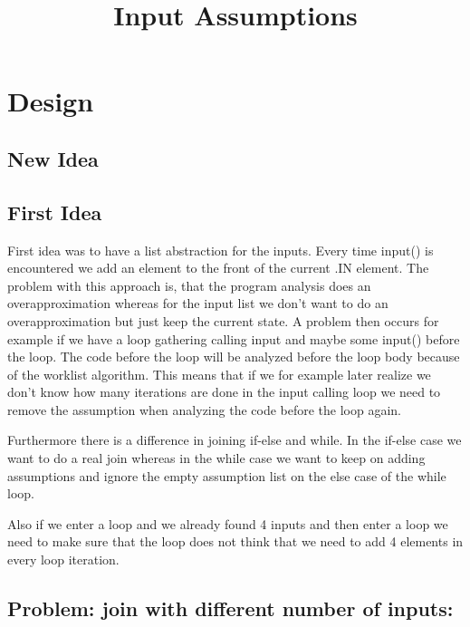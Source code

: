 \documentclass[11pt]{article}
\begin{document}
\title{Input Assumptions}

\maketitle


\section{Design}

\subsection{New Idea}



\subsection{First Idea}

First idea was to have a list abstraction for the inputs. Every time input() is encountered we add an element to the front of the current .IN element. The problem with this approach is, that the program analysis does an overapproximation whereas for the input list we don't want to do an overapproximation but just keep the current state. A problem then occurs for example if we have a loop gathering calling input and maybe some input() before the loop. The code before the loop will be analyzed before the loop body because of the worklist algorithm. This means that if we for example later realize we don't know how many iterations are done in the input calling loop we need to remove the assumption when analyzing the code before the loop again. 

Furthermore there is a difference in joining if-else and while. In the if-else case we want to do a real join whereas in the while case we want to keep on adding assumptions and ignore the empty assumption list on the else case of the while loop. 

Also if we enter a loop and we already found 4 inputs and then enter a loop we need to make sure that the loop does not think that we need to add 4 elements in every loop iteration.

\subsection{Problem: join with different number of inputs:}
\end{document}
